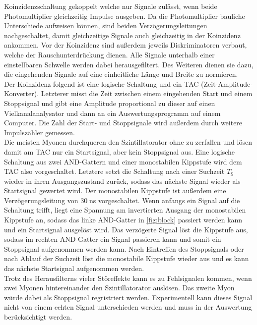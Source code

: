 Koinzidenzschaltung gekoppelt welche nur Signale zulässt, wenn beide Photomultiplier gleichzeitig Impulse 
ausgeben. Da die Photomultiplier bauliche Unterschiede aufweisen können, sind beiden Verzögerungsleitungen 
nachgeschaltet, damit gleichzeitige Signale auch gleichzeitig in der Koinzidenz ankommen.
Vor der Koinzidenz sind außerdem jeweils Diskriminatoren verbaut, welche der Rauschunterdrückung dienen. 
Alle Signale unterhalb einer einstellbaren Schwelle werden dabei herausgefiltert. 
Des Weiteren dienen sie dazu, die eingehenden Signale auf eine einheitliche Länge und Breite zu normieren.\\
Der Koinzidenz folgend ist eine logische Schaltung und ein TAC (Zeit-Amplitude-Konverter). Letzterer misst die 
Zeit zwischen einem eingehenden Start und einem Stoppsignal und gibt eine Amplitude proportional 
zu dieser auf einen Vielkanalanalysator und dann an ein Auswertungsprogramm auf einem Computer.
Die Zahl der Start- und Stoppsignale wird außerdem durch weitere Impulszähler gemessen. \\
Die meisten Myonen durchqueren den Szintillatorator ohne zu zerfallen und lösen damit am TAC nur ein Startsignal, 
aber kein Stoppsignal aus. Eine logische Schaltung aus zwei AND-Gattern und einer monostabilen Kippstufe wird dem TAC 
also vorgeschaltet. Letztere setzt die Schaltung nach einer Suchzeit $T_{\text{S}}$ wieder in ihren 
Ausgangszustand zurück, sodass das nächste Signal wieder als Startsignal gewertet wird.
Der monostabilen Kippstufe ist außerdem eine Verzögerungsleitung von $30\;$ns vorgeschaltet.
Wenn anfangs ein Signal auf die Schaltung trifft, liegt eine Spannung am invertierten Ausgang der monostabilen Kippstufe an,
sodass das linke AND-Gatter in \autoref{fig:block} passiert werden kann und ein Startsignal ausgelöst wird. Das verzögerte Signal löst 
die Kippstufe aus, sodass im rechten AND-Gatter ein Signal passieren kann und somit ein Stoppsignal aufgenommen werden kann.
Nach Eintreffen des Stoppsignals oder nach Ablauf der Suchzeit löst die monostabile Kippstufe wieder aus und 
es kann das nächste Startsignal aufgenommen werden. \\
Trotz des Herausfilterns vieler Störeffekte kann es zu Fehlsignalen kommen, wenn zwei Myonen hintereinander 
den Szintillatorator auslösen. Das zweite Myon würde dabei als Stoppsignal regristriert werden. Experimentell kann 
dieses Signal nicht von einem echten Signal unterschieden werden und muss in der Auswertung berücksichtigt werden.

